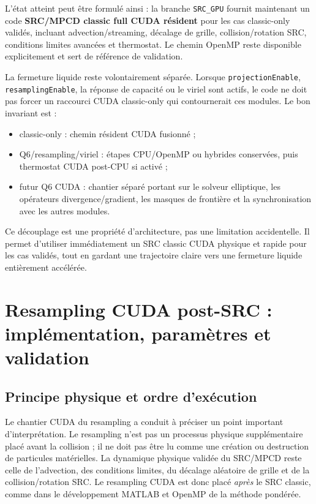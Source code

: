 \documentclass[11pt,a4paper]{article}
\begin{document}
L'état atteint peut être formulé ainsi : la branche \texttt{SRC\_GPU} fournit maintenant un code \textbf{SRC/MPCD classic full CUDA résident} pour les cas classic-only validés, incluant advection/streaming, décalage de grille, collision/rotation SRC, conditions limites avancées et thermostat. Le chemin OpenMP reste disponible explicitement et sert de référence de validation.

La fermeture liquide reste volontairement séparée. Lorsque \texttt{projectionEnable}, \texttt{resamplingEnable}, la réponse de capacité ou le viriel sont actifs, le code ne doit pas forcer un raccourci CUDA classic-only qui contournerait ces modules. Le bon invariant est :
\begin{itemize}[nosep]
  \item classic-only : chemin résident CUDA fusionné ;
  \item Q6/resampling/viriel : étapes CPU/OpenMP ou hybrides conservées, puis thermostat CUDA post-CPU si activé ;
  \item futur Q6 CUDA : chantier séparé portant sur le solveur elliptique, les opérateurs divergence/gradient, les masques de frontière et la synchronisation avec les autres modules.
\end{itemize}

Ce découplage est une propriété d'architecture, pas une limitation accidentelle. Il permet d'utiliser immédiatement un SRC classic CUDA physique et rapide pour les cas validés, tout en gardant une trajectoire claire vers une fermeture liquide entièrement accélérée.



\section{Resampling CUDA post-SRC : implémentation, paramètres et validation}

\subsection{Principe physique et ordre d'exécution}

Le chantier CUDA du resampling a conduit à préciser un point important d'interprétation. Le resampling n'est pas un processus physique supplémentaire placé avant la collision ; il ne doit pas être lu comme une création ou destruction de particules matérielles. La dynamique physique validée du SRC/MPCD reste celle de l'advection, des conditions limites, du décalage aléatoire de grille et de la collision/rotation SRC. Le resampling CUDA est donc placé \emph{après} le SRC classic, comme dans le développement MATLAB et OpenMP de la méthode pondérée.
\end{document}

